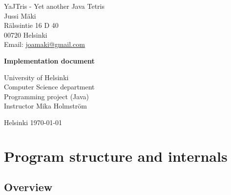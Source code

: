 \documentclass[11pt,a4paper]{article}
\begin{document}
\begin{titlepage}

  \begin{flushleft}
  \large
  \noindent YaJTris - Yet another Java Tetris \\
  Jussi Mäki \\
  Rälssintie 16 D 40 \\
  00720 Helsinki \\
  Email: \href{mailto:joamaki@gmail.com}{joamaki@gmail.com} \\
  \end{flushleft}

  \begin{center} \sloppy
    \vfill

    \huge \textbf{Implementation document} \vfill

    \vspace{3mm}
  \end{center}

  \begin{flushright}
    \large
    University of Helsinki \\
    Computer Science department \\
    Programming project (Java)\\
    Instructor Mika Holmström

    Helsinki \today
  \end{flushright}

\end{titlepage}


\thispagestyle{empty}

\tableofcontents

\setcounter{page}{1}
\newpage



\section {Program structure and internals}
\subsection {Overview}
\end{document}
